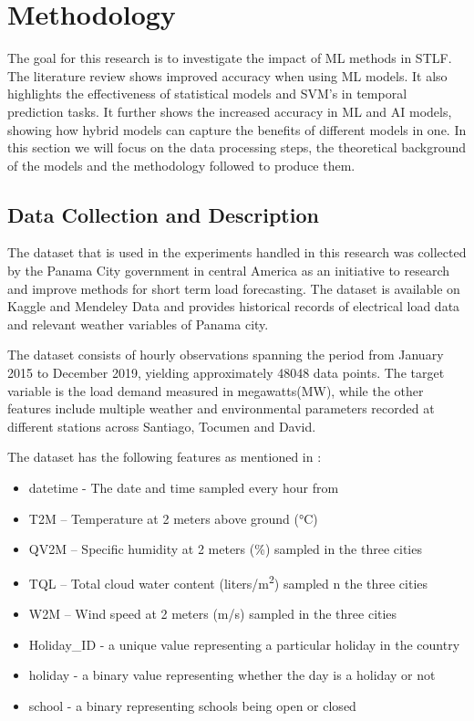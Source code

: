 \chapter{Methodology}

The goal for this research is to investigate the impact of ML methods in STLF. The literature review shows improved accuracy when using ML models. It also highlights the effectiveness of statistical models and SVM's in temporal prediction tasks. It further shows the increased accuracy in ML and AI models, showing how hybrid models can capture the benefits of different models in one. In this section we will focus on the data processing steps, the theoretical background of the models and the methodology followed to produce them.  

\section{Data Collection and Description}
The dataset that is used in the experiments handled in this research was collected by the Panama City government in central America as an initiative to research and improve  methods for short term load forecasting. The dataset is available on Kaggle and  Mendeley Data and provides historical records of electrical load data and relevant weather variables of Panama city\cite{dataset}.

The dataset consists of hourly observations spanning the period from January 2015 to December 2019, yielding approximately 48048 data points. The target variable is the load demand measured in megawatts(MW), while the other features include multiple weather and environmental parameters recorded at different stations across Santiago, Tocumen and David. 

The dataset has the following features as mentioned in \cite{dataset}:
{\small
\begin{itemize}
	\item datetime - The date and time sampled every hour from 
	\item T2M – Temperature at 2 meters above ground (°C)
	\item QV2M – Specific humidity at 2 meters (\%) sampled in the three cities
	\item TQL – Total cloud water content (liters/\si{m^2}) sampled n the three cities
	\item W2M – Wind speed at 2 meters (m/s) sampled in the three cities
	\item Holiday\_ID - a unique value representing a particular holiday in the country
	\item holiday - a binary value representing whether the day is a holiday or not
	\item school - a binary representing schools being open or closed 
	
\end{itemize}
}

